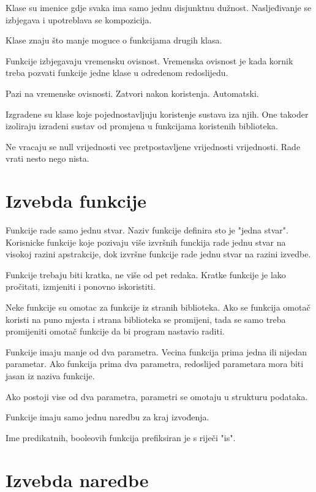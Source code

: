 \documentclass[times, utf8, diplomski, numeric]{fer}
\begin{document}
Klase su imenice gdje svaka ima samo jednu disjunktnu dužnost. Nasljeđivanje se izbjegava i upotreblava se kompozicija.

Klase znaju što manje moguce o funkcijama drugih klasa.

Funkcije izbjegavaju vremensku ovisnost. Vremenska ovisnost je kada kornik treba pozvati funkcije jedne klase u odredenom redoslijedu.

Pazi na vremenske ovisnosti. Zatvori nakon koristenja. Automatski.

Izgradene su klase koje pojednostavljuju koristenje sustava iza njih. One takoder izoliraju izradeni sustav od promjena u funkcijama koristenih biblioteka.

Ne vracaju se null vrijednosti vec pretpostavljene vrijednosti vrijednosti. Rade vrati nesto nego nista.










\section{Izvebda funkcije}

Funkcije rade samo jednu stvar. Naziv funkcije definira sto je "jedna stvar". Korisnicke funkcije koje pozivaju više izvršnih funckija rade jednu stvar na visokoj razini apstrakcije, dok izvršne funkcije rade jednu stvar na razini izvedbe.

Funkcije trebaju biti kratka, ne više od pet redaka. Kratke funkcije je lako pročitati, izmjeniti i ponovno iskoristiti.

Neke funkcije su omotac za funkcije iz stranih biblioteka. Ako se funkcija omotač koristi na puno mjesta i strana biblioteka se promijeni, tada se samo treba promijeniti omotač funkcije da bi program nastavio raditi.

Funkcije imaju manje od dva parametra. Vecina funkcija prima jedna ili nijedan parametar. Ako funkcija prima dva parametra, redoslijed parametara mora biti jasan iz naziva funkcije.

Ako postoji vise od dva parametra, parametri se omotaju u strukturu podataka.

Funkcije imaju samo jednu naredbu za kraj izvođenja. 

Ime predikatnih, booleovih funkcija prefiksiran je s riječi "is".



\section{Izvebda naredbe}
\end{document}
